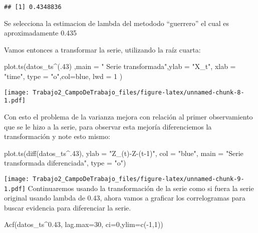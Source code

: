 \documentclass[
]{article}
\newenvironment{Shaded}{\begin{snugshade}}{\end{snugshade}}
\newcommand{\AttributeTok}[1]{\textcolor[rgb]{0.77,0.63,0.00}{#1}}
\newcommand{\DecValTok}[1]{\textcolor[rgb]{0.00,0.00,0.81}{#1}}
\newcommand{\FloatTok}[1]{\textcolor[rgb]{0.00,0.00,0.81}{#1}}
\newcommand{\FunctionTok}[1]{\textcolor[rgb]{0.00,0.00,0.00}{#1}}
\newcommand{\NormalTok}[1]{#1}
\newcommand{\SpecialCharTok}[1]{\textcolor[rgb]{0.00,0.00,0.00}{#1}}
\newcommand{\StringTok}[1]{\textcolor[rgb]{0.31,0.60,0.02}{#1}}
\begin{document}
\begin{verbatim}
## [1] 0.4348836
\end{verbatim}

Se selecciona la estimacion de lambda del metododo ``guerrero'' el cual
es aproximadamente 0.435

Vamos entonces a transformar la serie, utilizando la raíz cuarta:

\begin{Shaded}
\begin{Highlighting}[]
\FunctionTok{plot.ts}\NormalTok{(datos\_ts}\SpecialCharTok{\^{}}\NormalTok{(.}\DecValTok{43}\NormalTok{) ,}\AttributeTok{main =} \StringTok{" Serie transformada"}\NormalTok{,}\AttributeTok{ylab =} \StringTok{"X\_t"}\NormalTok{, }\AttributeTok{xlab =} \StringTok{"time"}\NormalTok{, }\AttributeTok{type =} \StringTok{"o"}\NormalTok{,}\AttributeTok{col=}\StringTok{\textquotesingle{}blue\textquotesingle{}}\NormalTok{, }\AttributeTok{lwd =} \DecValTok{1}\NormalTok{ )}
\end{Highlighting}
\end{Shaded}

\texttt{[image: Trabajo2\_CampoDeTrabajo\_files/figure-latex/unnamed-chunk-8-1.pdf]}

Con esto el problema de la varianza mejora con relación al primer
observamiento que se le hizo a la serie, para observar esta mejoría
diferenciemos la transformación y note esto mismo:

\begin{Shaded}
\begin{Highlighting}[]
\FunctionTok{plot.ts}\NormalTok{(}\FunctionTok{diff}\NormalTok{(datos\_ts}\SpecialCharTok{\^{}}\NormalTok{.}\DecValTok{43}\NormalTok{), }\AttributeTok{ylab =} \StringTok{"Z\_(t){-}Z{-}(t{-}1)"}\NormalTok{, }\AttributeTok{col =} \StringTok{"blue"}\NormalTok{, }
        \AttributeTok{main =} \StringTok{"Serie transformada diferenciada"}\NormalTok{, }\AttributeTok{type =} \StringTok{"o"}\NormalTok{)}
\end{Highlighting}
\end{Shaded}

\texttt{[image: Trabajo2\_CampoDeTrabajo\_files/figure-latex/unnamed-chunk-9-1.pdf]}
Continuaremos usando la transformación de la serie como si fuera la
serie original usando lambda de 0.43, ahora vamos a graficar los
correlogramas para buscar evidencia para diferenciar la serie.

\begin{Shaded}
\begin{Highlighting}[]
\FunctionTok{Acf}\NormalTok{(datos\_ts}\SpecialCharTok{\^{}}\FloatTok{0.43}\NormalTok{, }\AttributeTok{lag.max=}\DecValTok{30}\NormalTok{, }\AttributeTok{ci=}\DecValTok{0}\NormalTok{,}\AttributeTok{ylim=}\FunctionTok{c}\NormalTok{(}\SpecialCharTok{{-}}\DecValTok{1}\NormalTok{,}\DecValTok{1}\NormalTok{))}
\end{Highlighting}
\end{Shaded}
\end{document}
